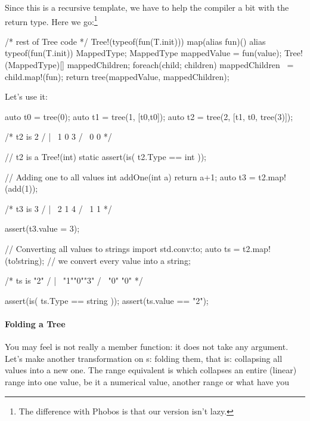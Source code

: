 Since this is a recursive template, we have to help the compiler a bit with the return type. Here we go:\footnote{ The difference with Phobos  is that our version isn't lazy.}

\begin{dcode}
/* rest of Tree code */
    Tree!(typeof(fun(T.init))) map(alias fun)()
    {
        alias typeof(fun(T.init)) MappedType;
        MappedType mappedValue = fun(value);
        Tree!(MappedType)[] mappedChildren;
        foreach(child; children) mappedChildren ~= child.map!(fun);
        return tree(mappedValue, mappedChildren);
    }
\end{dcode}

Let's use it:

\begin{dcode}
auto t0 = tree(0);
auto t1 = tree(1, [t0,t0]);
auto t2 = tree(2, [t1, t0, tree(3)]);

/* t2 is       2
             / | \
            1  0  3
           / \
          0   0
*/

// t2 is a Tree!(int)
static assert(is( t2.Type == int ));

// Adding one to all values
int addOne(int a) { return a+1;}
auto t3 = t2.map!(add(1));

/* t3 is       3
             / | \
            2  1  4
           / \
          1   1
*/

assert(t3.value = 3);

// Converting all values to strings
import std.conv:to;
auto ts = t2.map!(to!string); // we convert every value into a string;

/* ts is      "2"
             / | \
           "1""0""3"
           / \
         "0"  "0"
*/

assert(is( ts.Type == string ));
assert(ts.value == "2");
\end{dcode}

\paragraph{Folding a Tree} You may feel  is not really a member function: it does not take any argument. Let's make another transformation on s: folding them, that is: collapsing all values into a new one. The range equivalent is  which collapses an entire (linear) range into one value, be it a numerical value, another range or what have you


